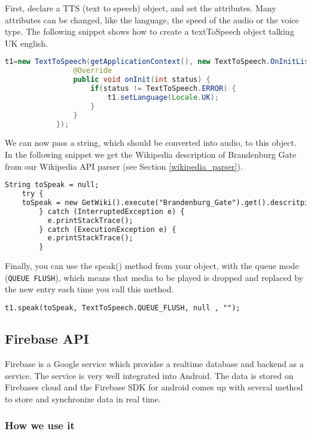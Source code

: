 First, declare a TTS (text to speech) object, and set the attributes. Many attributes can be changed, like the language, the speed of the audio or the voice type. The following snippet shows how to create a textToSpeech object talking UK english.
\begin{lstlisting}[language=Java, basicstyle=\scriptsize]
    t1=new TextToSpeech(getApplicationContext(), new TextToSpeech.OnInitListener() {
                @Override
                public void onInit(int status) {
                    if(status != TextToSpeech.ERROR) {
                        t1.setLanguage(Locale.UK);
                    }
                }
            });
\end{lstlisting}

We can now pass a string, which should be converted into audio, to this object. In the following snippet we get the Wikipedia description of Brandenburg Gate from our Wikipedia API parser (see Section \ref{wikipedia_parser}).
\begin{lstlisting}[language=XML, basicstyle=\scriptsize]
    String toSpeak = null;
    try {
    toSpeak = new GetWiki().execute("Brandenburg_Gate").get().descritpion;
        } catch (InterruptedException e) {
          e.printStackTrace();
        } catch (ExecutionException e) {
          e.printStackTrace();
        }
\end{lstlisting}

Finally, you can use the speak() method from your object, with the queue mode (\texttt{QUEUE FLUSH}), which means that media to be played is dropped and replaced by the new entry each time you call this method.

\begin{lstlisting}[language=XML, basicstyle=\scriptsize]
    t1.speak(toSpeak, TextToSpeech.QUEUE_FLUSH, null , "");
\end{lstlisting}

\subsection{Firebase API}
Firebase is a Google service which providse a realtime database and backend as a service. The service is very well integrated into Android. The data is stored on Firebases cloud and the Firebase SDK for android comes up with several method to store and synchronize data in real time.

\subsubsection{How we use it}

